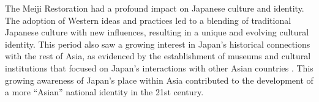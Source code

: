 \documentclass{article}
\begin{document}
The Meiji Restoration had a profound impact on Japanese culture and identity. The adoption of Western ideas and practices led to a blending of traditional Japanese culture with new influences, resulting in a unique and evolving cultural identity. This period also saw a growing interest in Japan's historical connections with the rest of Asia, as evidenced by the establishment of museums and cultural institutions that focused on Japan's interactions with other Asian countries \cite{Carlile2010ExploringA}. This growing awareness of Japan's place within Asia contributed to the development of a more ``Asian'' national identity in the 21st century.






\end{document}
